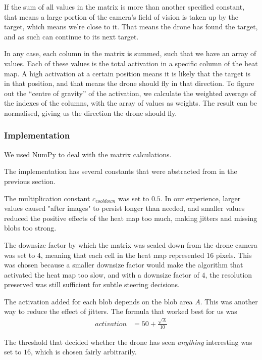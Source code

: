 \documentclass[a4paper,10pt]{article}
\begin{document}
If the sum of all values in the matrix is more than another specified constant,
that means a large portion of the camera's field of vision is taken up
by the target, which means we're close to it. That means the drone has
found the target, and as such can continue to its next target.

In any case, each column in the matrix is summed, such that we have an
array of values. Each of these values is the total activation in a specific
column of the heat map. A high activation at a certain position means it is
likely that the target is in that position, and that means the drone should
fly in that direction. To figure out the ``centre of gravity'' of the
activation, we calculate the weighted average of the indexes of the columns,
with the array of values as weights. The result can be normalised, giving us
the direction the drone should fly.

\subsubsection{Implementation}
We used NumPy to deal with the matrix calculations.

The implementation has several constants that were abstracted from in the
previous section.

The multiplication constant $c_{{cooldown}}$ was set to
$0.5$. In our experience, larger values caused "after images" to persist
longer than needed, and smaller values reduced the positive effects of
the heat map too much, making jitters and missing blobs too strong.

The downsize factor by which the matrix was scaled down from the
drone camera was set to $4$, meaning that each cell in the heat map represented $16$
pixels. This was chosen because a smaller downsize factor would make the
algorithm that activated the heat map too slow, and with a downsize factor of
$4$, the resolution preserved was still sufficient for subtle steering
decisions.

The activation added for each blob depends on the blob area $A$. This was
another way to reduce the effect of jitters. The formula
that worked best for us was
\begin{align*}
 activation &=50 + \frac{\sqrt{A}}{10}
\end{align*}


The threshold that decided whether the drone has seen \emph{anything}
interesting was set to $16$, which is chosen fairly arbitrarily.
\end{document}
